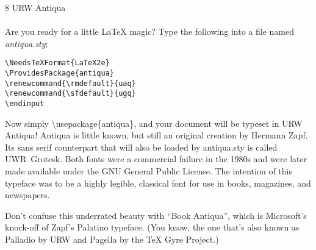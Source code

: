 \documentclass{article}
\begin{document}
\frenchspacing
\noindent
{\LARGE 8 URW Antiqua}\\
~\\
Are you ready for a little \LaTeX{} magic? Type the following into a file named \mbox{\emph{antiqua.sty}}:

\begin{verbatim}
\NeedsTeXFormat{LaTeX2e}
\ProvidesPackage{antiqua}
\renewcommand{\rmdefault}{uaq}
\renewcommand{\sfdefault}{ugq}
\endinput
\end{verbatim}

\noindent
Now simply \textbackslash{}usepackage\{antiqua\}, and your document
will be typeset in URW Antiqua! Antiqua is little known, but still an
original creation by Hermann Zapf. Its sans serif counterpart that
will also be loaded by antiqua.sty is called \mbox{{\sf UWR Grotesk}}. Both
fonts were a commercial failure in the 1980s and were later made
available under the GNU General Public License.  The intention of this
typeface was to be a highly legible, classical font for use in books,
magazines, and newspapers.

Don't confuse this underrated beauty with ``Book Antiqua'', which is
Microsoft's knock-off of Zapf's Palatino typeface. (You know, the one
that's also known as Palladio by URW and Pagella by the \TeX{} Gyre
Project.)
\end{document}
